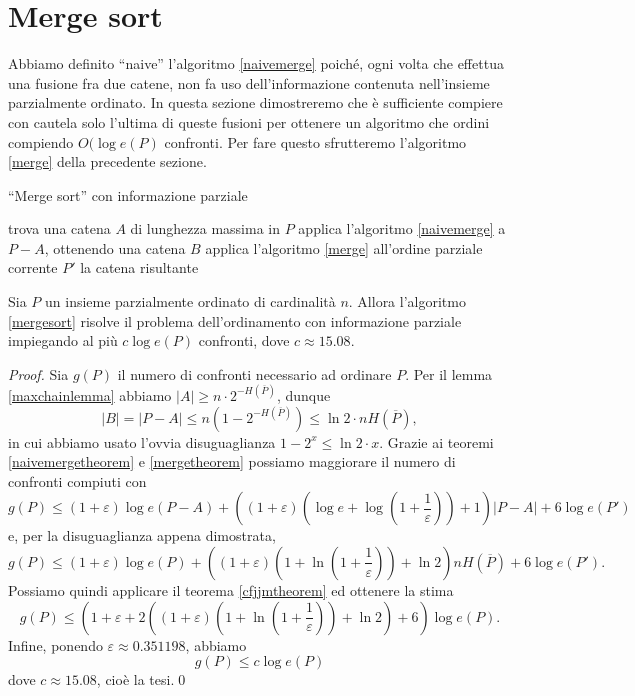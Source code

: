 \section{Merge sort}
Abbiamo definito ``naive'' l'algoritmo \ref{naivemerge} poich\'e, ogni volta che effettua una fusione fra due catene, non fa uso dell'informazione contenuta nell'insieme parzialmente ordinato. In questa sezione dimostreremo che \`e sufficiente compiere con cautela solo l'ultima di queste fusioni per ottenere un algoritmo che ordini compiendo \(O(\log{e(P)}\) confronti. Per fare questo sfrutteremo l'algoritmo \ref{merge} della precedente sezione.
\begin{algorithm}
	\caption{``Merge sort'' con informazione parziale} \label{mergesort} 
	\begin{algorithmic}
		[1] \STATE trova una catena \(A\) di lunghezza massima in \(P\) \STATE applica l'algoritmo \ref{naivemerge} a \(P-A\), ottenendo una catena \(B\) \STATE applica l'algoritmo \ref{merge} all'ordine parziale corrente \(P'\) \RETURN la catena risultante 
	\end{algorithmic}
\end{algorithm}
\begin{theorem}
	\label{mergesorttheorem} Sia \(P\) un insieme parzialmente ordinato di cardinalità \(n\). Allora l'algoritmo \ref{mergesort} risolve il problema dell'ordinamento con informazione parziale impiegando al più \(c \log{e(P)}\) confronti, dove \(c\approx 15.08\). 
\end{theorem}
\begin{proof}
	Sia \(g(P)\) il numero di confronti necessario ad ordinare \(P\). Per il lemma \ref{maxchainlemma} abbiamo \(|A|\ge n\cdot 2^{-H(\overline{P})}\), dunque
	\[|B|=|P-A|\le n\left(1-2^{-H(\overline{P})}\right)\le\ln{2}\cdot nH(\overline{P}),\]
	in cui abbiamo usato l'ovvia disuguaglianza \(1-2^{x}\le\ln{2}\cdot x\). Grazie ai teoremi \ref{naivemergetheorem} e \ref{mergetheorem} possiamo maggiorare il numero di confronti compiuti con
	\[g(P)\le(1+\varepsilon)\log{e(P-A)}+\left((1+\varepsilon)\left(\log{e}+\log{\left(1+\frac{1}{\varepsilon}\right)}\right)+1\right)|P-A|+6\log{e(P')}\]
	e, per la disuguaglianza appena dimostrata,
	\[ g(P)\le(1+\varepsilon)\log{e(P)}+\left((1+\varepsilon)\left(1+\ln{\left(1+\frac{1}{\varepsilon}\right)}\right)+\ln{2}\right)nH(\overline{P})+6\log{e(P')}.\]
	Possiamo quindi applicare il teorema \ref{cfjjmtheorem} ed ottenere la stima
	\[g(P)\le\left(1+\varepsilon+2\left((1+\varepsilon)\left(1+\ln{\left(1+\frac{1}{\varepsilon}\right)}\right)+\ln{2}\right)+6\right)\log{e(P)}.\]
	Infine, ponendo \(\varepsilon\approx 0.351198\), abbiamo
	\[g(P)\le c\log{e(P)}\nonumber\]
	dove \(c\approx 15.08\), cioè la tesi.\qed 
\end{proof}
